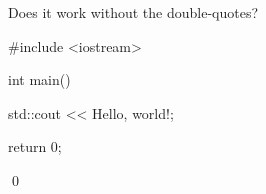Does it work without the double-quotes?
\begin{console}
#include <iostream>

int main()
{
    std::cout << Hello, world!\n;

    return 0;
}
\end{console}
\qed

